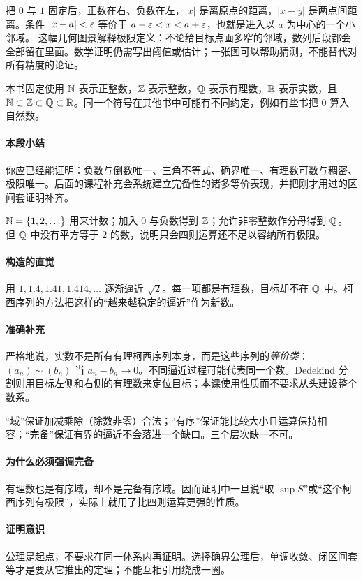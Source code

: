 把 $0$ 与 $1$ 固定后，正数在右、负数在左，$|x|$ 是离原点的距离，$|x-y|$ 是两点间距离。条件 $|x-a|<\varepsilon$ 等价于 $a-\varepsilon<x<a+\varepsilon$，也就是进入以 $a$ 为中心的一个小邻域。
这幅几何图景解释极限定义：不论给目标点画多窄的邻域，数列后段都会全部留在里面。数学证明仍需写出阈值或估计；一张图可以帮助猜测，不能替代对所有精度的论证。

本书固定使用 $\mathbb{N}$ 表示正整数，$\mathbb{Z}$ 表示整数，$\mathbb{Q}$ 表示有理数，$\mathbb{R}$ 表示实数，且 $\mathbb{N}\subset\mathbb{Z}\subset\mathbb{Q}\subset\mathbb{R}$。同一个符号在其他书中可能有不同约定，例如有些书把 $0$ 算入自然数。
\paragraph{本段小结}你应已经能证明：负数与倒数唯一、三角不等式、确界唯一、有理数可数与稠密、极限唯一。后面的课程补充会系统建立完备性的诸多等价表现，并把刚才用过的区间套证明补齐。

$\mathbb{N}=\{1,2,\ldots\}$ 用来计数；加入 $0$ 与负数得到 $\mathbb{Z}$；允许非零整数作分母得到 $\mathbb{Q}$。但 $\mathbb{Q}$ 中没有平方等于 $2$ 的数，说明只会四则运算还不足以容纳所有极限。
\paragraph{构造的直觉}用 $1,1.4,1.41,1.414,\ldots$ 逐渐逼近 $\sqrt2$。每一项都是有理数，目标却不在 $\mathbb{Q}$ 中。柯西序列的方法把这样的“越来越稳定的逼近”作为新数。
\paragraph{准确补充}严格地说，实数不是所有有理柯西序列本身，而是这些序列的\emph{等价类}：$(a_n)\sim(b_n)$ 当 $a_n-b_n\to0$。不同逼近过程可能代表同一个数。Dedekind 分割则用目标左侧和右侧的有理数来定位目标；本课使用性质而不要求从头建设整个数系。

“域”保证加减乘除（除数非零）合法；“有序”保证能比较大小且运算保持相容；“完备”保证有界的逼近不会落进一个缺口。三个层次缺一不可。
\paragraph{为什么必须强调完备}有理数也是有序域，却不是完备有序域。因而证明中一旦说“取 $\sup S$”或“这个柯西序列有极限”，实际上就用了比四则运算更强的性质。
\paragraph{证明意识}公理是起点，不要求在同一体系内再证明。选择确界公理后，单调收敛、闭区间套等才是要从它推出的定理；不能互相引用绕成一圈。

